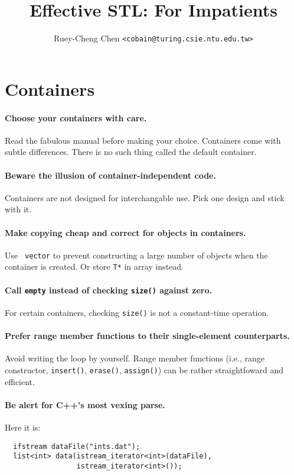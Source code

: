 \documentclass{article}
\begin{document}
\author{Ruey-Cheng Chen {\tt <cobain@turing.csie.ntu.edu.tw>}}
\title{Effective STL: For Impatients}
\maketitle

\section{Containers}

\paragraph{Choose your containers with care.}  Read the fabulous manual before
making your choice.  Containers come with subtle differences.  There is no such
thing called the default container.

\paragraph{Beware the illusion of container-independent code.} Containers are
not designed for interchangable use.  Pick one design and stick with it.

\paragraph{Make copying cheap and correct for objects in containers.} Use {\tt
vector} to prevent constructing a large number of objects
when the container is created.  Or store {\tt T*} in array instead.

\paragraph{Call {\tt empty} instead of checking {\tt size()} against zero.} For
certain containers, checking {\tt size()} is not a constant-time operation.

\paragraph{Prefer range member functions to their single-element counterparts.}
Avoid writing the loop by yourself.  Range member functions (i.e., range
constructor, {\tt insert()}, {\tt erase()}, {\tt assign()}) can be rather
straightfoward and efficient.  

\paragraph{Be alert for C++'s most vexing parse.}  Here it is:
\begin{verbatim}
  ifstream dataFile("ints.dat");
  list<int> data(istream_iterator<int>(dataFile),
                 istream_iterator<int>());
\end{verbatim}
\end{document}
